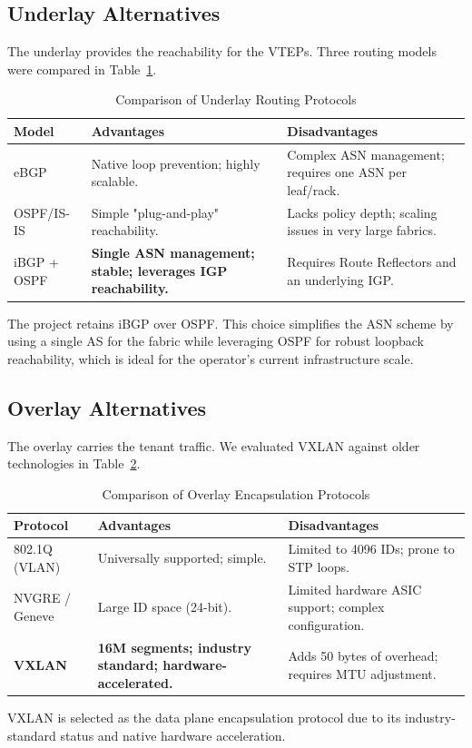 \subsection*{Underlay Alternatives}
The underlay provides the reachability for the VTEPs. Three routing models were compared in Table~\ref{tab:underlay_comp}.

\begin{table}[!htbp]
    \centering
    \small
    \begin{tabularx}{\textwidth}{l X X}
        \toprule
        \textbf{Model} & \textbf{Advantages} & \textbf{Disadvantages} \\
        \midrule
        eBGP & Native loop prevention; highly scalable. & Complex ASN management; requires one ASN per leaf/rack. \\
        \midrule
        OSPF/IS-IS & Simple "plug-and-play" reachability. & Lacks policy depth; scaling issues in very large fabrics. \\
        \midrule
        iBGP + OSPF & \textbf{Single ASN management; stable; leverages IGP reachability.} & Requires Route Reflectors and an underlying IGP. \\
        \bottomrule
    \end{tabularx}
    \caption{Comparison of Underlay Routing Protocols}
    \label{tab:underlay_comp}
\end{table}
The project retains iBGP over OSPF. This choice simplifies the ASN scheme by using a single AS for the fabric while leveraging OSPF for robust loopback reachability, which is ideal for the operator's current infrastructure scale.

\subsection*{Overlay Alternatives}
The overlay carries the tenant traffic. We evaluated VXLAN against older technologies in Table~\ref{tab:overlay_comp}.

\begin{table}[!htbp]
    \centering
    \small
    \begin{tabularx}{\textwidth}{l X X}
        \toprule
        \textbf{Protocol} & \textbf{Advantages} & \textbf{Disadvantages} \\
        \midrule
        802.1Q (VLAN) & Universally supported; simple. & Limited to 4096 IDs; prone to STP loops. \\
        \midrule
        NVGRE / Geneve & Large ID space (24-bit). & Limited hardware ASIC support; complex configuration. \\
        \midrule
        \textbf{VXLAN} & \textbf{16M segments; industry standard; hardware-accelerated.} & Adds 50 bytes of overhead; requires MTU adjustment. \\
        \bottomrule
    \end{tabularx}
    \caption{Comparison of Overlay Encapsulation Protocols}
    \label{tab:overlay_comp}
\end{table}
VXLAN is selected as the data plane encapsulation protocol due to its industry-standard status and native hardware acceleration.

